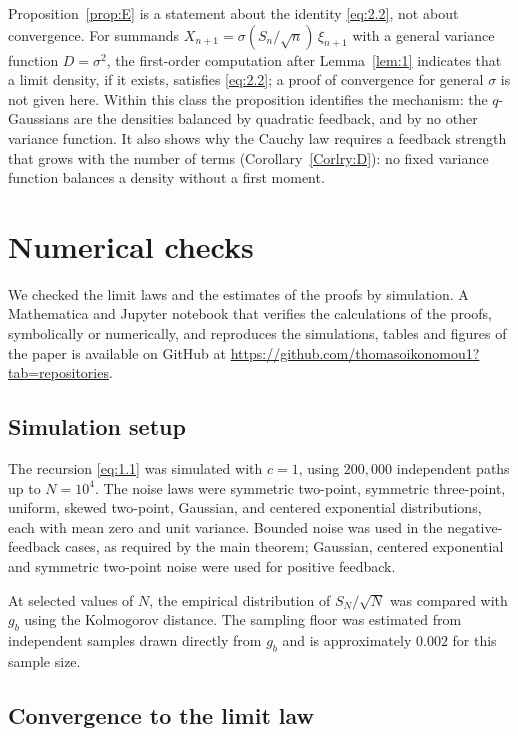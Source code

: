 \documentclass[aip,jmp,preprint,onecolumn,floatfix,superscriptaddress,nofootinbib,11pt]{revtex4-2}
\theoremstyle{plain}
\theoremstyle{remark}
\numberwithin{equation}{section}
\begin{document}
Proposition~\ref{prop:E} is a statement about the identity \eqref{eq:2.2}, not about convergence. For summands $X_{n+1}=\sigma(S_n/\sqrt n)\,\xi_{n+1}$ with a general variance function $D=\sigma^{2}$, the first-order computation after Lemma~\ref{lem:1} indicates that a limit density, if it exists, satisfies \eqref{eq:2.2}; a proof of convergence for general $\sigma$ is not given here. Within this class the proposition identifies the mechanism: the $q$-Gaussians are the densities balanced by quadratic feedback, and by no other variance function. It also shows why the Cauchy law requires a feedback strength that grows with the number of terms (Corollary~\ref{Corlry:D}): no fixed variance function balances a density without a first moment.
 
\section{Numerical checks}\label{app:num}
 
We checked the limit laws and the estimates of the proofs by simulation. A Mathematica and Jupyter notebook that verifies the calculations of the proofs, symbolically or numerically, and reproduces the simulations, tables and figures of the paper is available on GitHub at \href{https://github.com/thomasoikonomou1?tab=repositories}{https://github.com/thomasoikonomou1?tab=repositories}.
 
\subsection{Simulation setup}\label{sec:6_1}
 
The recursion \eqref{eq:1.1} was simulated with $c=1$, using $200{,}000$ independent paths up to $N=10^{4}$. The noise laws were symmetric two-point, symmetric three-point, uniform, skewed two-point, Gaussian, and centered exponential distributions, each with mean zero and unit variance. Bounded noise was used in the negative-feedback cases, as required by the main theorem; Gaussian, centered exponential and symmetric two-point noise were used for positive feedback.
 
At selected values of $N$, the empirical distribution of $S_N/\sqrt N$ was compared with $g_b$ using the Kolmogorov distance. The sampling floor was estimated from independent samples drawn directly from $g_b$ and is approximately $0.002$ for this sample size.
 
\subsection{Convergence to the limit law}\label{sec:6_2}
 
\end{document}
